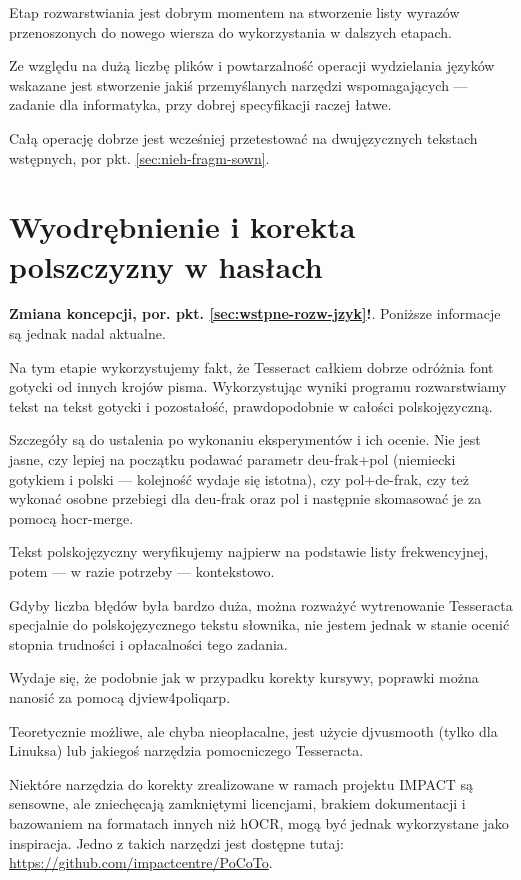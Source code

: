 \documentclass[12]{mwart}
\newcommand{\program}[1]{\textsf{#1}}
\begin{document}
Etap rozwarstwiania jest dobrym momentem na stworzenie listy wyrazów
przenoszonych do nowego wiersza do wykorzystania w dalszych etapach.

Ze względu na dużą liczbę plików i powtarzalność operacji wydzielania
języków wskazane jest stworzenie jakiś przemyślanych narzędzi
wspomagających --- zadanie dla informatyka, przy dobrej specyfikacji
raczej łatwe.

Całą operację dobrze jest wcześniej przetestować na dwujęzycznych
tekstach wstępnych, por pkt. \ref{sec:nieh-fragm-sown}.


\section{Wyodrębnienie i korekta polszczyzny w hasłach}
\label{sec:wyodrbn-polszczyzny}

\textbf{Zmiana koncepcji,
  por. pkt. \ref{sec:wstpne-rozw-jzyk}!}. Poniższe informacje są
jednak nadal aktualne.

Na tym etapie wykorzystujemy fakt, że \program{Tesseract} całkiem
dobrze odróżnia font gotycki od innych krojów pisma. Wykorzystując
wyniki programu rozwarstwiamy tekst na tekst gotycki i pozostałość,
prawdopodobnie w całości polskojęzyczną.

Szczegóły są do ustalenia po wykonaniu eksperymentów i ich ocenie. Nie
jest jasne, czy lepiej na początku podawać parametr
\textsf{deu-frak+pol} (niemiecki gotykiem i polski --- kolejność
wydaje się istotna), czy \textsf{pol+de-frak}, czy też wykonać osobne
przebiegi dla \textsf{deu-frak} oraz \textsf{pol} i następnie
skomasować je za pomocą \program{hocr-merge}.

Tekst polskojęzyczny weryfikujemy najpierw na podstawie listy
frekwencyjnej, potem --- w razie potrzeby --- kontekstowo.

Gdyby liczba błędów była bardzo duża, można rozważyć wytrenowanie
\program{Tesseracta} specjalnie do polskojęzycznego tekstu słownika,
nie jestem jednak w stanie ocenić stopnia trudności i opłacalności
tego zadania.

Wydaje się, że podobnie jak w przypadku korekty kursywy, poprawki
można nanosić za pomocą \program{djview4poliqarp}.

Teoretycznie możliwe, ale chyba nieopłacalne, jest użycie
\program{djvusmooth} (tylko dla Linuksa) lub jakiegoś narzędzia
pomocniczego \program{Tesseracta}.

Niektóre narzędzia do korekty zrealizowane w ramach projektu IMPACT są
sensowne, ale zniechęcają zamkniętymi licencjami, brakiem dokumentacji
i bazowaniem na formatach innych niż hOCR, mogą być jednak
wykorzystane jako inspiracja. Jedno z takich narzędzi jest dostępne
tutaj: \url{https://github.com/impactcentre/PoCoTo}.
\end{document}
